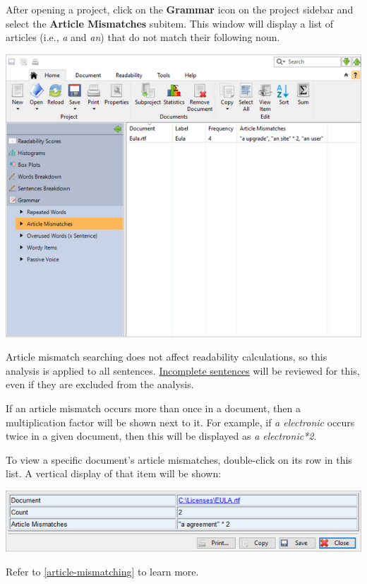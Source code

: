 \documentclass[
]{book}
\theoremstyle{definition}
\theoremstyle{definition}
\theoremstyle{definition}
\theoremstyle{definition}
\theoremstyle{remark}
\begin{document}
After opening a project, click on the \textbf{Grammar} icon on the project sidebar and select the \textbf{Article Mismatches} subitem. This window will display a list of articles (i.e., \emph{a} and \emph{an}) that do not match their following noun.

\includegraphics{Images/batcharticlemismatches.png}

Article mismatch searching does not affect readability calculations, so this analysis is applied to all sentences. \protect\hyperlink{how-text-is-excluded}{Incomplete sentences} will be reviewed for this, even if they are excluded from the analysis.

If an article mismatch occurs more than once in a document, then a multiplication factor will be shown next to it. For example, if \emph{a electronic} occurs twice in a given document, then this will be displayed as \emph{a electronic*2}.

To view a specific document's article mismatches, double-click on its row in this list. A vertical display of that item will be shown:

\begin{center}\includegraphics[width=0.75\linewidth,]{Images/viewitemarticlemismatch} \end{center}

Refer to \ref{article-mismatching} to learn more.
\end{document}
